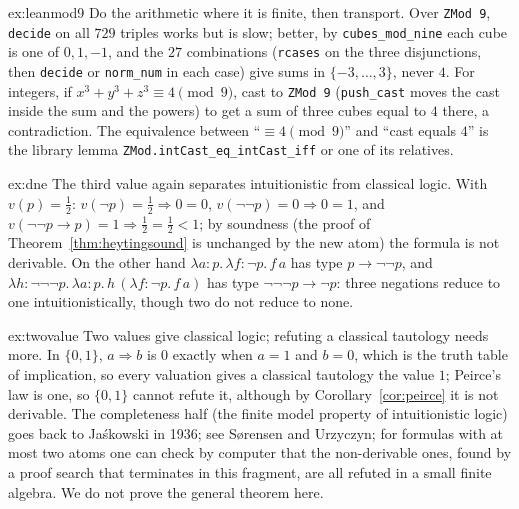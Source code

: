 \begin{solution}{ex:leanmod9}
\idea Do the arithmetic where it is finite, then transport.
\writeup Over \texttt{ZMod 9}, \texttt{decide} on all $729$ triples works but is slow; better, by \texttt{cubes\_mod\_nine} each cube is one of $0,1,-1$, and the $27$ combinations (\texttt{rcases} on the three disjunctions, then
\texttt{decide} or \texttt{norm\_num} in each case) give sums in $\{-3,\dots,3\}$, never $4$. For integers, if $x^3+y^3+z^3\equiv4\pmod 9$, cast to \texttt{ZMod 9} (\texttt{push\_cast} moves the cast inside the sum and the powers) to
get a sum of three cubes equal to $4$ there, a contradiction. The equivalence between ``$\equiv4\pmod9$'' and ``cast equals $4$'' is the library lemma \texttt{ZMod.intCast\_eq\_intCast\_iff} or one of its relatives.
\end{solution}

\begin{solution}{ex:dne}
\idea The third value again separates intuitionistic from classical logic.
\writeup With $v(p)=\frac12$: $v(\neg p)=\frac12\Rightarrow0=0$, $v(\neg\neg p)=0\Rightarrow0=1$, and $v(\neg\neg p\to p)=1\Rightarrow\frac12=\frac12<1$; by soundness (the proof of Theorem~\ref{thm:heytingsound} is unchanged by the new atom)
the formula is not derivable. On the other hand $\lambda a{:}p.\,\lambda f{:}\neg p.\,f\,a$ has type $p\to\neg\neg p$, and $\lambda h{:}\neg\neg\neg p.\,\lambda a{:}p.\,h\,(\lambda f{:}\neg p.\,f\,a)$ has type $\neg\neg\neg p\to\neg p$: three negations
reduce to one intuitionistically, though two do not reduce to none.
\end{solution}

\begin{solution}{ex:twovalue}
\idea Two values give classical logic; refuting a classical tautology needs more.
\writeup In $\{0,1\}$, $a\Rightarrow b$ is $0$ exactly when $a=1$ and $b=0$, which is the truth table of implication, so every valuation gives a classical tautology the value $1$; Peirce's law is one, so $\{0,1\}$ cannot refute it, although
by Corollary~\ref{cor:peirce} it is not derivable. The completeness half (the finite model property of intuitionistic logic) goes back to Ja\'skowski in 1936; see S{\o}rensen and Urzyczyn; for formulas with at most two atoms one can check by computer that the non-derivable
ones, found by a proof search that terminates in this fragment, are all refuted in a small finite algebra. We do not prove the general theorem here.
\end{solution}

